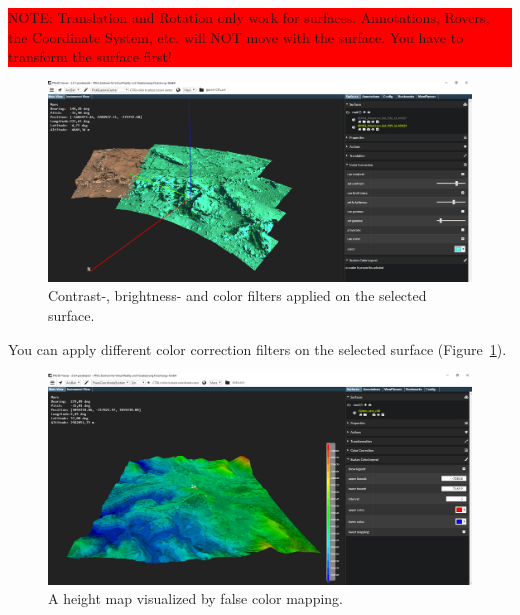 \begin{center}
\colorbox{red}{\parbox{1.0\textwidth}{NOTE: Translation and Rotation only work for surfaces. Annotations, Rovers, the Coordinate System, etc. will NOT move with the surface. You have to transform the surface first!}}
\end{center}

\begin{figure}[h]
    	\centering
    		\includegraphics[width=1\textwidth]{pics/SurfaceColorCorrection.png}
    	\caption[Surface Color Correction]{Contrast-, brightness- and color filters applied on the selected surface.}
    	\label{fig:surfaceColorCorrection}
   \end{figure}

You can apply different color correction filters on the selected surface	(Figure~\ref{fig:surfaceColorCorrection}). \\

\begin{figure}[h]
    	\centering
    		\includegraphics[width=1\textwidth]{pics/SurfaceColorLegend.png}
    	\caption[Surface Color Legend]{A height map visualized by false color mapping.}
    	\label{fig:surfaceColorLegend}
   \end{figure}
	

